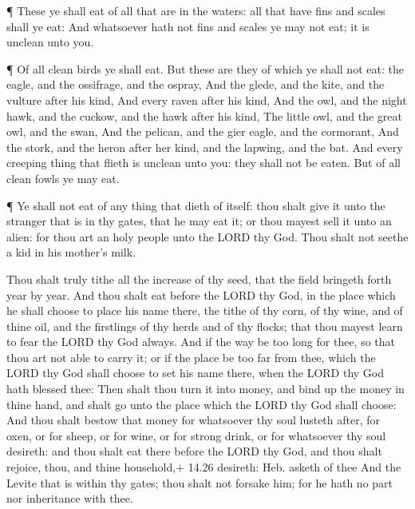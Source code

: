  ¶ These ye shall eat of all that are in the waters: all
that have fins and scales shall ye eat:  And whatsoever
hath not fins and scales ye may not eat; it is unclean unto you.

 ¶ Of all clean birds ye shall eat.  But these
are they of which ye shall not eat: the eagle, and the ossifrage, and
the ospray,  And the glede, and the kite, and the vulture
after his kind,  And every raven after his kind,
 And the owl, and the night hawk, and the cuckow, and the
hawk after his kind,  The little owl, and the great owl,
and the swan,  And the pelican, and the gier eagle, and the
cormorant,  And the stork, and the heron after her kind,
and the lapwing, and the bat.  And every creeping thing
that flieth is unclean unto you: they shall not be eaten. 
But of all clean fowls ye may eat.

 ¶ Ye shall not eat of any thing that dieth of itself: thou
shalt give it unto the stranger that is in thy gates, that he may eat
it; or thou mayest sell it unto an alien: for thou art an holy people
unto the LORD thy God. Thou shalt not seethe a kid in his mother's milk.

 Thou shalt truly tithe all the increase of thy seed, that
the field bringeth forth year by year.  And thou shalt eat
before the LORD thy God, in the place which he shall choose to place his
name there, the tithe of thy corn, of thy wine, and of thine oil, and
the firstlings of thy herds and of thy flocks; that thou mayest learn to
fear the LORD thy God always.  And if the way be too long
for thee, so that thou art not able to carry it; or if the place be too
far from thee, which the LORD thy God shall choose to set his name
there, when the LORD thy God hath blessed thee:  Then shalt
thou turn it into money, and bind up the money in thine hand, and shalt
go unto the place which the LORD thy God shall choose:  And
thou shalt bestow that money for whatsoever thy soul lusteth after, for
oxen, or for sheep, or for wine, or for strong drink, or for whatsoever
thy soul desireth: and thou shalt eat there before the LORD thy God, and
thou shalt rejoice, thou, and thine household,+ 14.26 desireth: Heb.
asketh of thee  And the Levite that is within thy gates;
thou shalt not forsake him; for he hath no part nor inheritance with
thee.

